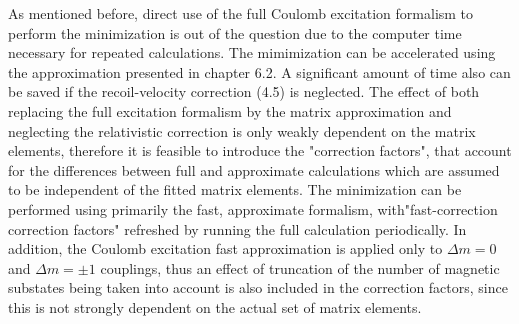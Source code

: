 \documentclass[10pt]{article}
\begin{document}
As mentioned before, direct use of the full Coulomb excitation formalism to perform the minimization is out of the question due to the computer time necessary for repeated calculations. The mimimization can be accelerated using the approximation presented in chapter 6.2. A significant amount of time also can be saved if the recoil-velocity correction (4.5) is neglected. The effect of both replacing the full excitation formalism by the matrix approximation and neglecting the relativistic correction is only weakly dependent on the matrix elements, therefore it is feasible to introduce the "correction factors", that account for the differences between full and approximate calculations which are assumed to be independent of the fitted matrix elements. The minimization can be performed using primarily the fast, approximate formalism, with"fast-correction correction factors" refreshed by running the full calculation periodically. In addition, the Coulomb excitation fast approximation is applied only to $\Delta m=0$ and $\Delta m= \pm 1$ couplings, thus an effect of truncation of the number of magnetic substates being taken into account is also included in the correction factors, since this is not strongly dependent on the actual set of matrix elements.
\end{document}
